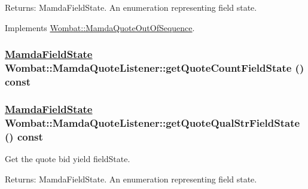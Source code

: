 \begin{Desc}
\item[Returns:]Mamda\-Field\-State. An enumeration representing field state. \end{Desc}


Implements \hyperlink{classWombat_1_1MamdaQuoteOutOfSequence_52c9ce74d5b5b74fd48280cac925ce8d}{Wombat::Mamda\-Quote\-Out\-Of\-Sequence}.\hypertarget{classWombat_1_1MamdaQuoteListener_3b4f752b2a7b92e5177b1d19abc1606e}{
\subsubsection[getQuoteCountFieldState]{\setlength{\rightskip}{0pt plus 5cm}\hyperlink{namespaceWombat_93aac974f2ab713554fd12a1fa3b7d2a}{Mamda\-Field\-State} Wombat::Mamda\-Quote\-Listener::get\-Quote\-Count\-Field\-State () const}}
\label{classWombat_1_1MamdaQuoteListener_3b4f752b2a7b92e5177b1d19abc1606e}


\hypertarget{classWombat_1_1MamdaQuoteListener_90a6df719e3f391f19edf4796f947b35}{
\subsubsection[getQuoteQualStrFieldState]{\setlength{\rightskip}{0pt plus 5cm}\hyperlink{namespaceWombat_93aac974f2ab713554fd12a1fa3b7d2a}{Mamda\-Field\-State} Wombat::Mamda\-Quote\-Listener::get\-Quote\-Qual\-Str\-Field\-State () const}}
\label{classWombat_1_1MamdaQuoteListener_90a6df719e3f391f19edf4796f947b35}


Get the quote bid yield field\-State. 

\begin{Desc}
\item[Returns:]Mamda\-Field\-State. An enumeration representing field state. \end{Desc}


